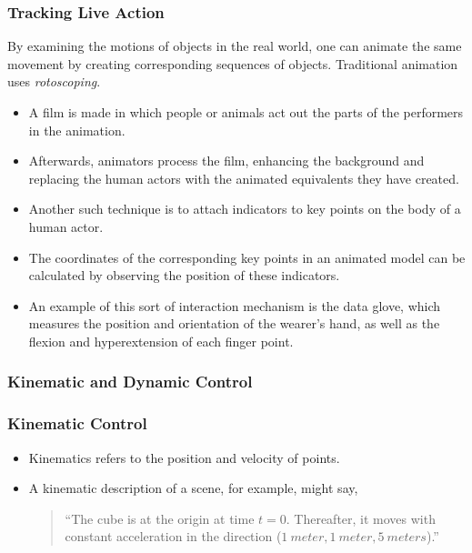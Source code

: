 \subsubsection{Tracking Live Action}
By examining the motions of objects in the real world, one can animate the same movement by creating corresponding sequences of objects. Traditional animation uses \textit{rotoscoping}. 
\begin{itemize}

	\item A film is made in which people or animals act out the parts of the performers in the animation. 
	\item Afterwards, animators process the film, enhancing the background and replacing the human actors with the animated equivalents they have created.
	\item Another such technique is to attach indicators to key points on the body of a	human actor. 
	\item The coordinates of the corresponding key points in an animated model can be calculated by observing the position of these indicators.
	\item An example of this sort of interaction mechanism is the data glove, which measures the position and orientation of the wearer's hand, as well as the flexion and hyperextension of each finger point.
\end{itemize}


\subsubsection{Kinematic and Dynamic Control}

\subsubsection*{Kinematic Control}
\begin{itemize}
	\item Kinematics refers to the position and velocity of points. 
	\item A kinematic description of a scene, for example, might say, 
	\begin{quotation}
		\noindent ``The cube is at the origin at time $ t=0 $. Thereafter, it moves with constant acceleration in the direction ($ 1 \:meter, 1 \:meter, 5 \:meters $).''
	\end{quotation}

\end{itemize}

